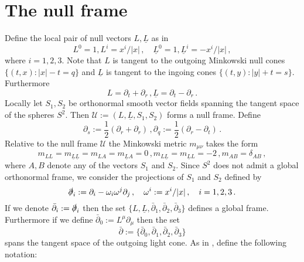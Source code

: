 \documentclass[11pt, a4paper]{amsart}
\numberwithin{equation}{section}
\numberwithin{theorem}{section}
\newcommand{\p}{\partial}
\newcommand{\mn}{{\mu \nu}}
\newcommand{\lbar}{\underline{L}}
\begin{document}
\section{The null frame} \label{section:null-frame}
Define the local pair of null vectors $L, \lbar$ as in \cite{LR:04} 
$$ L^0 = 1, L^i = x^i / \vert x \vert \,, \quad \lbar^0 = 1, \lbar^i = - x^i / \vert x \vert \,, $$
where $i = 1,2,3$. Note that $L$ is tangent to the outgoing Minkowski null cones $\{ (t, x) : \vert x \vert - t = q \}$ and $\lbar$ is tangent to the ingoing cones $\{ (t, y) : \vert y \vert + t = s \}$. 
Furthermore
$$ L = \p_t + \p_r \,, \lbar = \p_t - \p_r \,.$$
Locally let $S_1, S_2$ be orthonormal smooth vector fields spanning the tangent space of the spheres $S^2$. Then  $\mathcal{U}:= (L, \lbar, S_1, S_2)$ forms a null frame.  Define
$$ \p_s := \frac{1}{2}(\p_r + \p_r) \,, \p_q:= \frac{1}{2} ( \p_r - \p_t) \,.$$
Relative to the null frame $\mathcal{U}$ the Minkowski metric $m_\mn$ takes the form
$$ m_{LL} = m_{\lbar \lbar} = m_{LA} = m_{\lbar A} = 0 \,, m_{L \lbar} = m_{\lbar L} = -2 \,, m_{AB} = \delta_{AB} \,, $$
where $A, B$ denote any of the vectors $S_1$ and $S_2$. Since $S^2$ does not admit a global orthonormal frame,  we consider the projections of $S_1$ and $S_2$ defined by
$$ \slashed{\p}_i := \p_i - \omega_i \omega^j \p_j \,, \quad  \omega^i := x^i / \vert x \vert \,, \quad 
i=1,2,3 \,. $$
If we denote $\bar{\p}_i := \slashed{\p}_i$  then the set $\{L, \lbar, \bar{\p}_1, \bar{\p}_2, \bar{\p}_3 \}$ defines a global frame. Furthermore if we define $\bar{\p}_0 := L^\mu \p_\mu$ then the set 
$$\bar{\p}:= \{ \bar{\p}_0, \bar{\p}_1, \bar{\p}_2, \bar{\p}_3\} $$ spans the tangent space of the outgoing light cone. As in \cite{LR:04}, define the following notation:
\end{document}
